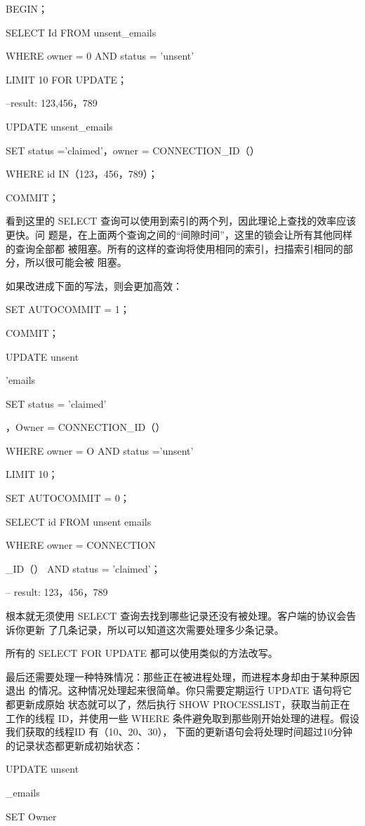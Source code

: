 BEGIN；

SELECT Id FROM unsent\_emails

WHERE owner = 0 AND status = 'unsent'

LIMIT 10 FOR UPDATE；

--result: 123,456，789

UPDATE unsent\_emails

SET status ='claimed'，owner = CONNECTION\_ID（）

WHERE id IN（123，456，789）；

COMMIT；

看到这里的 SELECT 查询可以使用到索引的两个列，因此理论上查找的效率应该更快。问
题是，在上面两个查询之间的“间隙时间”，这里的锁会让所有其他同样的查询全部都
被阻塞。所有的这样的查询将使用相同的索引，扫描索引相同的部分，所以很可能会被
阻塞。

如果改进成下面的写法，则会更加高效：

SET AUTOCOMMIT = 1；

COMMIT；

UPDATE unsent

'emails

SET status = 'claimed'

，Owner = CONNECTION\_ID（）

WHERE owner = O AND status ='unsent'

LIMIT 10；

SET AUTOCOMMIT = 0；

SELECT id FROM unsent emails

WHERE owner = CONNECTION

\_ID（） AND status = 'claimed'；

-- result: 123，456，789

根本就无须使用 SELECT 查询去找到哪些记录还没有被处理。客户端的协议会告诉你更新
了几条记录，所以可以知道这次需要处理多少条记录。

所有的 SELECT FOR UPDATE 都可以使用类似的方法改写。

最后还需要处理一种特殊情况：那些正在被进程处理，而进程本身却由于某种原因退出
的情况。这种情况处理起来很简单。你只需要定期运行 UPDATE 语句将它都更新成原始
状态就可以了，然后执行 SHOW PROCESSLIST，获取当前正在工作的线程 ID，并使用一些
WHERE 条件避免取到那些刚开始处理的进程。假设我们获取的线程ID 有（10、20、30），
下面的更新语句会将处理时间超过10分钟的记录状态都更新成初始状态：

UPDATE unsent

\_emails

SET Owner

